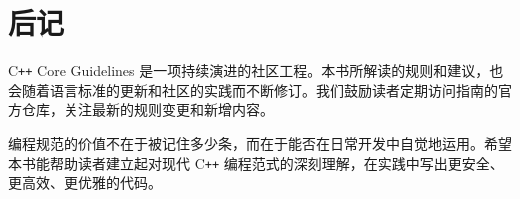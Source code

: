 \documentclass[12pt,a4paper,fontset=fandol]{ctexbook}
\begin{document}
\backmatter

\chapter{后记}

C\texttt{++} Core Guidelines 是一项持续演进的社区工程。本书所解读的规则和建议，也会随着语言标准的更新和社区的实践而不断修订。我们鼓励读者定期访问指南的官方仓库，关注最新的规则变更和新增内容。

编程规范的价值不在于被记住多少条，而在于能否在日常开发中自觉地运用。希望本书能帮助读者建立起对现代 C\texttt{++} 编程范式的深刻理解，在实践中写出更安全、更高效、更优雅的代码。

\printindex
\end{document}

